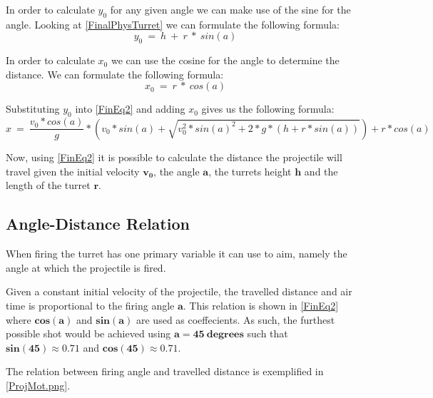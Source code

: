 In order to calculate $y_0$ for any given angle we can make use of the sine for
the angle. Looking at \autoref{FinalPhysTurret} we can formulate the following
formula:
\begin{equation}\label{Y0Eq}
y_0\ =\ h\ +\ r\ *\ sin(a)
\end{equation}\nl

In order to calculate $x_0$ we can use the cosine for the angle to determine the
distance. We can formulate the following formula:
\begin{equation}\label{Y0Eq}
x_0\ =\ r\ *\ cos(a)
\end{equation}

Substituting $y_0$ into \autoref{FinEq2} and adding $x_0$ gives
us the following formula:
\begin{equation}\label{FinEq2}
x\ =\ \frac{v_0*cos(a)}{g}* \left(
v_0*sin(a)+\sqrt{v_0^2*sin(a)^2+2*g*(h+r*sin(a))}\right)+r*cos(a)
\end{equation}

Now, using \autoref{FinEq2} it is possible to calculate the
distance the projectile will travel given the initial velocity $\mathbf{v_0}$,
the angle $\mathbf{a}$, the turrets height $\mathbf{h}$ and the length of the
turret $\mathbf{r}$.

\subsection{Angle-Distance Relation}
When firing the turret has one primary variable it can use to aim,
namely the angle at which the projectile is fired.


Given a constant initial velocity of the projectile, the travelled distance and
air time is proportional to the firing angle $\mathbf{a}$. This relation is
shown in \autoref{FinEq2} where $\mathbf{cos(a)}$ and $\mathbf{sin(a)}$ are used as
coeffecients. As such, the furthest possible shot would be achieved using
$\mathbf{a=45\ degrees}$ such that $\mathbf{sin(45)\approx 0.71}$ and
$\mathbf{cos(45)\approx 0.71}$.

The relation between firing angle and travelled distance is exemplified in
\autoref{ProjMot.png}.



